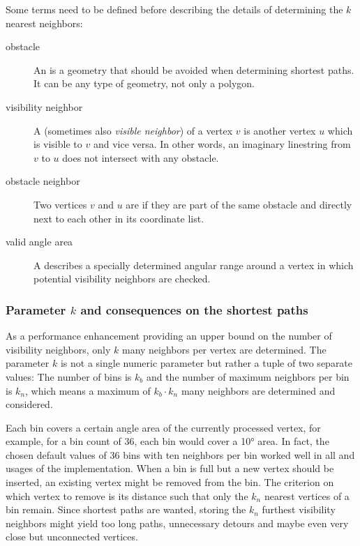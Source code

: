 			Some terms need to be defined before describing the details of determining the $k$ nearest neighbors:
			\begin{description}
				\item[obstacle] An  is a geometry that should be avoided when determining shortest paths. It can be any type of geometry, not only a polygon.
				\item[visibility neighbor] A  (sometimes also \emph{visible neighbor}) of a vertex $v$ is another vertex $u$ which is visible to $v$ and vice versa. In other words, an imaginary linestring from $v$ to $u$ does not intersect with any obstacle.
				\item[obstacle neighbor] Two vertices $v$ and $u$ are  if they are part of the same obstacle and directly next to each other in its coordinate list.
				\item[valid angle area] A  describes a specially determined angular range around a vertex in which potential visibility neighbors are checked.
			\end{description}
		
		\subsubsection{Parameter $k$ and consequences on the shortest paths}
		
			As a performance enhancement providing an upper bound on the number of visibility neighbors, only $k$ many neighbors per vertex are determined.
			The parameter $k$ is not a single numeric parameter but rather a tuple of two separate values:
			The number of bins is $k_b$ and the number of maximum neighbors per bin is $k_n$, which means a maximum of $k_b \cdot k_n$ many neighbors are determined and considered.
			
			Each bin covers a certain angle area of the currently processed vertex, for example, for a bin count of 36, each bin would cover a 10° area.
			In fact, the chosen default values of 36 bins with ten neighbors per bin worked well in all and usages of the implementation.
			When a bin is full but a new vertex should be inserted, an existing vertex might be removed from the bin.
			The criterion on which vertex to remove is its distance such that only the $k_n$ nearest vertices of a bin remain.
			Since shortest paths are wanted, storing the $k_n$ furthest visibility neighbors might yield too long paths, unnecessary detours and maybe even very close but unconnected vertices.
			
